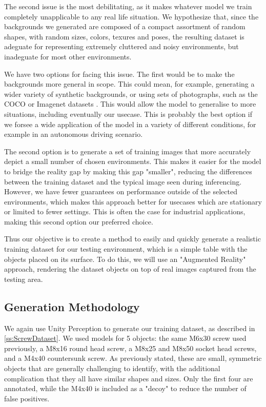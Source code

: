The second issue is the most debilitating, as it makes whatever model we train completely unapplicable to any real life situation. We hypothesize that, since the backgrounds we generated are composed of a compact assortment of random shapes, with random sizes, colors, texures and poses, the resulting dataset is adeguate for representing extremely cluttered and noisy environments, but inadeguate for most other environments.

We have two options for facing this issue. The first would be to make the backgrounds more general in scope. This could mean, for example, generating a wider variety of synthetic backgrounds, or using sets of photographs, such as the COCO or Imagenet datasets \cite{DPOD}. This would allow the model to generalise to more situations, including eventually our usecase. This is probably the best option if we forsee a wide application of the model in a variety of different conditions, for example in an autonomous driving scenario.

The second option is to generate a set of training images that more accurately depict a small number of chosen environments. This makes it easier for the model to bridge the reality gap by making this gap "smaller", reducing the differences between the training dataset and the typical image seen during inferencing. However, we have fewer guarantees on performance outside of the selected environments, which makes this approach better for usecases which are stationary or limited to fewer settings. This is often the case for industrial applications, making this second option our preferred choice.

Thus our objective is to create a method to easily and quickly generate a realistic training dataset for our testing environment, which is a simple table with the objects placed on its surface. To do this, we will use an "Augmented Reality" approach, rendering the dataset objects on top of real images captured from the testing area.

\subsection{Generation Methodology}

We again use Unity Perception to generate our training dataset, as described in \ref{ss:ScrewDataset}. We used models for 5 objects: the same M6x30 screw used previously, a M8x16 round head screw, a M8x25 and M8x50 socket head screws, and a M4x40 countersunk screw. As previously stated, these are small, symmetric objects that are generally challenging to identify, with the additional complication that they all have similar shapes and sizes. Only the first four  are annotated, while the M4x40 is included as a "decoy" to reduce the number of false positives.

